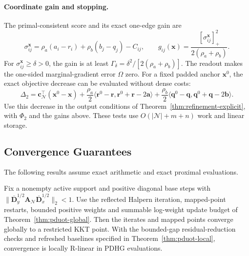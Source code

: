 \paragraph{Coordinate gain and stopping.}
The primal-consistent score and its exact one-edge gain are
\begin{equation*}
\sigma_{ij}^{\mathbf x}=\rho_a(a_i-r_i)+\rho_b(b_j-q_j)-C_{ij},\qquad
g_{ij}(\mathbf x)=\frac{[\sigma_{ij}^{\mathbf x}]_+^2}{2(\rho_a+\rho_b)}.
\end{equation*}
For $\sigma_{ij}^{\mathbf x}\geq\delta>0$, the gain is at least $\Gamma_\delta=\delta^2/[2(\rho_a+\rho_b)]$.
The readout makes the one-sided marginal-gradient error $\Omega$ zero.
For a fixed padded anchor $\mathbf x^0$, the exact objective decrease can be evaluated without dense costs:
\begin{equation*}
\Delta_2=\mathbf c_{\mathcal N}^{\top}(\mathbf x^0-\mathbf x)
+\frac{\rho_a}{2}\langle\mathbf r^0-\mathbf r,\mathbf r^0+\mathbf r-2\mathbf a\rangle
+\frac{\rho_b}{2}\langle\mathbf q^0-\mathbf q,\mathbf q^0+\mathbf q-2\mathbf b\rangle.
\end{equation*}
Use this decrease in the output conditions of Theorem~\ref{thm:refinement-explicit}, with $\Phi_2$ and the gains above.
These tests use $O(|\mathcal N|+m+n)$ work and linear storage.

\subsection{Convergence Guarantees}
\label{app:l2-convergence}

The following results assume exact arithmetic and exact proximal evaluations.

\begin{theorem}
\label{thm:l2-pduot}
Fix a nonempty active support and positive diagonal base steps with $\|\overline{\mathbf D}_y^{1/2}\mathbf A_{\mathcal N}\overline{\mathbf D}_x^{1/2}\|_2<1$.
Use the reflected Halpern iteration, mapped-point restarts, bounded positive weights and summable log-weight update budget of Theorem~\ref{thm:pduot-global}.
Then the iterates and mapped points converge globally to a restricted KKT point.
With the bounded-gap residual-reduction checks and refreshed baselines specified in Theorem~\ref{thm:pduot-local}, convergence is locally R-linear in PDHG evaluations.
\end{theorem}

